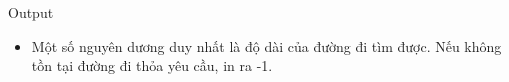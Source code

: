 Output
\begin{itemize}
	\item     Một số nguyên dương duy nhất là độ dài của đường đi tìm được. Nếu không tồn tại đường đi thỏa yêu cầu, in ra -1.   
\end{itemize}